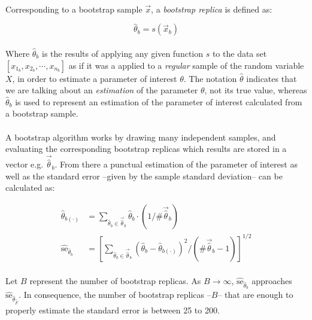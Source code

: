 \documentclass[letterpaper]{article}
\begin{document}
\paragraph{}
Corresponding to a bootstrap sample $\vec{x}$, a \textit{bootstrap replica} is defined as:

\begin{equation}
    \hat{\theta}_b=s(\vec{x}_b)
\end{equation}

\paragraph{}
Where $\hat{\theta}_b$ is the results of applying any given function $s$ to the data set $[x_{1_b},x_{2_b},\cdots,x_{n_b}]$ as if it was a applied to a \textit{regular} sample of the random variable $X$, in order to estimate a parameter of interest $\theta$. The notation $\hat{\theta}$ indicates that we are talking about an \textit{estimation} of the parameter $\theta$, not its true value, whereas $\hat{\theta}_b$ is used to represent an estimation of the parameter of interest calculated from a bootstrap sample.

\paragraph{}
A bootstrap algorithm works by drawing many independent samples, and evaluating the corresponding bootstrap replicas which results are stored in a vector e.g. $\vec{\hat{\theta}}_b$. From there a punctual estimation of the parameter of interest as well as the standard error --given by the sample standard deviation-- can be calculated as:

\begin{align}
        \hat{\theta}_{b(\cdot)}&=\sum_{\hat{\theta}_b\in\vec{\hat{\theta}}_b}\hat{\theta}_b\cdot\left(1/\#\vec{\hat{\theta}}_b\right) \\
        \hat{\mathrm{se}}_{\hat{\theta}_b}&=\left[\sum_{\hat{\theta}_b\in\vec{\hat{\theta}}_b}\left(\hat{\theta}_b-\hat{\theta}_{b(\cdot)}\right)^2/\left(\#\vec{\hat{\theta}}_b-1\right)\right]^{1/2}
\end{align}

\paragraph{}
Let $B$ represent the number of bootstrap replicas. As $B\rightarrow\infty$, $\hat{\mathrm{se}}_{\hat{\theta}_b}$ approaches $\hat{\mathrm{se}}_{\hat{\theta}_{\hat{F}}}$. In consequence, the number of bootstrap replicas --$B$--  that are enough to properly estimate the standard error is between 25 to 200.
\end{document}
